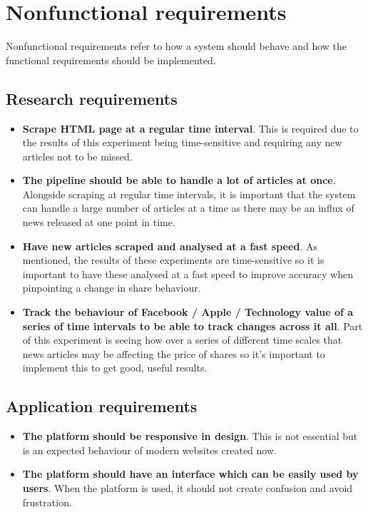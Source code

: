 \documentclass[a4paper,11pt]{report}
\begin{document}
\section{Nonfunctional requirements}
Nonfunctional requirements refer to how a system should behave and how the functional requirements should be implemented.

\subsection{Research requirements}
\begin{itemize}
    \item \textbf{Scrape HTML page at a regular time interval}. This is required due to the results of this experiment being time-sensitive and requiring any new articles not to be missed.
  \item \textbf{The pipeline should be able to handle a lot of articles at once}. Alongside scraping at regular time intervals, it is important that the system can handle a large number of articles at a time as there may be an influx of news released at one point in time.
    \item \textbf{Have new articles scraped and analysed at a fast speed}. As mentioned, the results of these experiments are time-sensitive so it is important to have these analysed at a fast speed to improve accuracy when pinpointing a change in share behaviour.
    \item \textbf{Track the behaviour of Facebook / Apple / Technology value of a series of time intervals to be able to track changes across it all}. Part of this experiment is seeing how over a series of different time scales that news articles may be affecting the price of shares so it's important to implement this to get good, useful results.
\end{itemize}

\subsection{Application requirements}
\begin{itemize}
    \item \textbf{The platform should be responsive in design}. This is not essential but is an expected behaviour of modern websites created now.
    \item \textbf{The platform should have an interface which can be easily used by users}. When the platform is used, it should not create confusion and avoid frustration.
\end{itemize}
\end{document}
